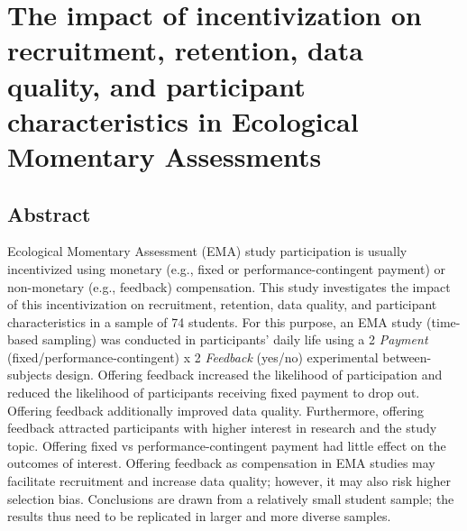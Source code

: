 \documentclass[authordate, empirical]{jote-new-article}
\author[1]{\mbox{Helge Giese\orcid{0000-0001-7609-0215}}}
\affil[1]{Charité}
\author[2]{\mbox{Laura M König\orcid{0000-0003-3655-8842}}}
\affil[2]{University of Vienna}
\begin{document}
\begin{frontmatter}
  \maketitle
  \begin{abstract}
    \printabstracttext
  \end{abstract}
\end{frontmatter}


	\section{\textbf{The impact of incentivization on recruitment, retention, data quality, and participant characteristics in Ecological Momentary Assessments}}







	\subsection{Abstract}



	Ecological Momentary Assessment (EMA) study participation is usually incentivized using monetary (e.g., fixed or performance-contingent payment) or non-monetary (e.g., feedback) compensation. This study investigates the impact of this incentivization on recruitment, retention, data quality, and participant characteristics in a sample of 74 students. For this purpose, an EMA study (time-based sampling) was conducted in participants' daily life using a 2 \emph{Payment }(fixed/performance-contingent) x 2 \emph{Feedback }(yes/no) experimental between-subjects design. Offering feedback increased the likelihood of participation and reduced the likelihood of participants receiving fixed payment to drop out. Offering feedback additionally improved data quality. Furthermore, offering feedback attracted participants with higher interest in research and the study topic. Offering fixed vs performance-contingent payment had little effect on the outcomes of interest. Offering feedback as compensation in EMA studies may facilitate recruitment and increase data quality; however, it may also risk higher selection bias. Conclusions are drawn from a relatively small student sample; the results thus need to be replicated in larger and more diverse samples.
\end{document}
